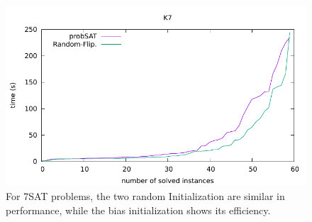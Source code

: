 \documentclass[12pt,a4paper,twoside]{scrartcl}
\numberwithin{equation}{section}
\begin{document}
  \begin{figure}[H]
\begin{center}
  \includegraphics[scale = 1]{DATA/K7/e4r.pdf}
  \end{center}
  \caption{For 7SAT problems, the two random Initialization are similar in performance, while the bias initialization shows its efficiency.}
  \label{Experiment 8 k7 cactus plot}
  \end{figure} 
\end{document}
